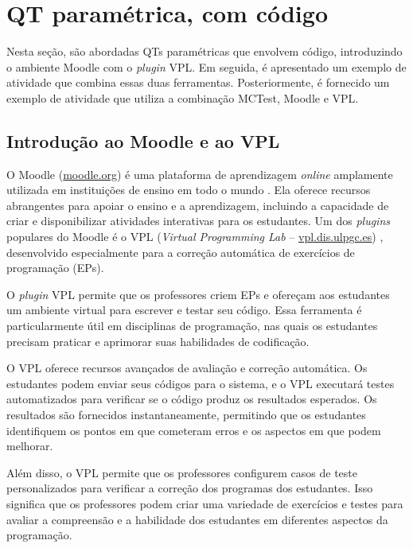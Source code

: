\section{QT paramétrica, com código}\label{sec:questoesQT_VPL}

Nesta seção, são abordadas QTs paramétricas que envolvem código, introduzindo o ambiente Moodle com o \textit{plugin} VPL. Em seguida, é apresentado um exemplo de atividade que combina essas duas ferramentas. Posteriormente, é fornecido um exemplo de atividade que utiliza a combinação MCTest, Moodle e VPL.

\subsection{Introdução ao Moodle e ao VPL}

O Moodle (\href{www.moodle.org}{moodle.org}) é uma plataforma de aprendizagem \textit{online} amplamente utilizada em instituições de ensino em todo o mundo \cite{presedo2015calibracion}. Ela oferece recursos abrangentes para apoiar o ensino e a aprendizagem, incluindo a capacidade de criar e disponibilizar atividades interativas para os estudantes. Um dos \textit{plugins} populares do Moodle é o VPL (\textit{Virtual Programming Lab} -- \href{https://vpl.dis.ulpgc.es/}{vpl.dis.ulpgc.es}) \cite{rodriguez2012virtual}, desenvolvido especialmente para a correção automática de exercícios de programação (EPs).

O \textit{plugin} VPL permite que os professores criem EPs e ofereçam aos estudantes um ambiente virtual para escrever e testar seu código. Essa ferramenta é particularmente útil em disciplinas de programação, nas quais os estudantes precisam praticar e aprimorar suas habilidades de codificação.

O VPL oferece recursos avançados de avaliação e correção automática. Os estudantes podem enviar seus códigos para o sistema, e o VPL executará testes automatizados para verificar se o código produz os resultados esperados. Os resultados são fornecidos instantaneamente, permitindo que os estudantes identifiquem os pontos em que cometeram erros e os aspectos em que podem melhorar.



Além disso, o VPL permite que os professores configurem casos de teste personalizados para verificar a correção dos programas dos estudantes. Isso significa que os professores podem criar uma variedade de exercícios e testes para avaliar a compreensão e a habilidade dos estudantes em diferentes aspectos da programação.

